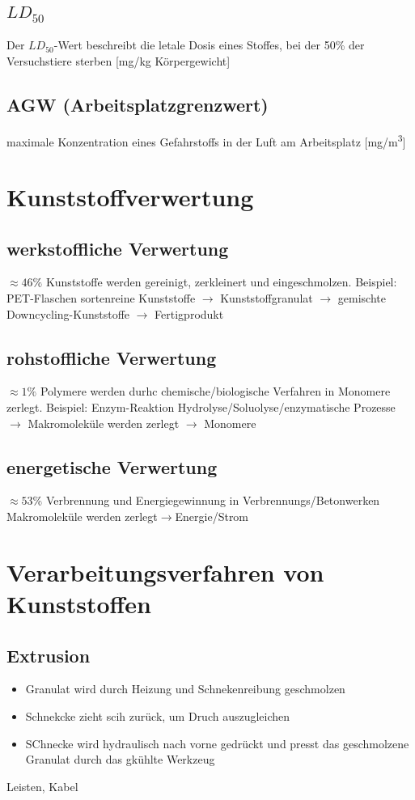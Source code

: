 \documentclass{article}
\begin{document}
\subsection*{$LD_{50}$}
Der $LD_{50}$-Wert beschreibt die letale Dosis eines Stoffes, bei der 50\% der Versuchstiere
sterben [\unit{mg}/\unit{kg} Körpergewicht]
\subsection*{AGW (Arbeitsplatzgrenzwert)}
maximale Konzentration eines Gefahrstoffs in der Luft am Arbeitsplatz [\unit{mg}/\unit{m^3}] 
\section*{Kunststoffverwertung}
\subsection*{werkstoffliche Verwertung}
$\approx 46\%$\newline
Kunststoffe werden gereinigt, zerkleinert und eingeschmolzen. Beispiel: PET-Flaschen\newline
sortenreine Kunststoffe $\rightarrow$ Kunststoffgranulat $\rightarrow$ gemischte Downcycling-Kunststoffe
$\rightarrow$ Fertigprodukt
\subsection*{rohstoffliche Verwertung}
$\approx 1\%$\newline
Polymere werden durhc chemische/biologische Verfahren in Monomere zerlegt. Beispiel: Enzym-Reaktion\newline
Hydrolyse/Soluolyse/enzymatische Prozesse $\rightarrow$ Makromoleküle werden zerlegt $\rightarrow$ Monomere
\subsection*{energetische Verwertung}
$\approx 53\%$\newline
Verbrennung und Energiegewinnung in Verbrennungs/Betonwerken\newline
Makromoleküle werden zerlegt$\rightarrow$Energie/Strom
\section*{Verarbeitungsverfahren von Kunststoffen}
\subsection*{Extrusion}
\begin{itemize}
    \item Granulat wird durch Heizung und Schnekenreibung geschmolzen
    \item Schnekcke zieht scih zurück, um Druch auszugleichen
    \item SChnecke wird hydraulisch nach vorne gedrückt und presst das geschmolzene Granulat
    durch das gkühlte Werkzeug
\end{itemize}
Leisten, Kabel
\end{document}
